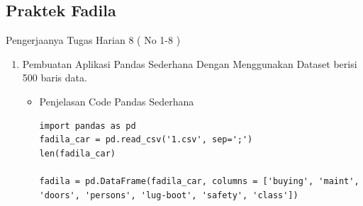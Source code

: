 \subsection{Praktek Fadila}
Pengerjaanya Tugas Harian 8 ( No 1-8 )
\begin{enumerate}
\item Pembuatan Aplikasi Pandas Sederhana Dengan Menggunakan Dataset berisi 500 baris data.
\begin{itemize}
\item Penjelasan Code Pandas Sederhana
\begin{lstlisting}
import pandas as pd
fadila_car = pd.read_csv('1.csv', sep=';')
len(fadila_car)

fadila = pd.DataFrame(fadila_car, columns = ['buying', 'maint', 'doors', 'persons', 'lug-boot', 'safety', 'class'])


\end{lstlisting}
\end{itemize}
\end{enumerate}

